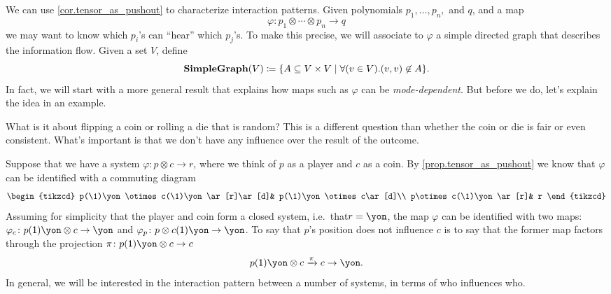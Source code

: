 \documentclass[Book-Poly]{subfiles}
\begin{document}
We can use \cref{cor.tensor_as_pushout} to characterize interaction patterns. Given polynomials $p_1,\ldots, p_n,$ and $q$, and a map
\[\varphi\colon p_1\otimes\cdots\otimes p_n\to q\]
we may want to know which $p_i$'s can ``hear'' which $p_j$'s. To make this precise, we will associate to $\varphi$ a simple directed graph that describes the information flow. Given a set $V$, define
\[
\textbf{SimpleGraph}(V)\coloneqq\{A\subseteq V\times V\mid \forall(v\in V). (v,v)\not\in A\}.
\]
In fact, we will start with a more general result that explains how maps such as $\varphi$ can be \emph{mode-dependent}. But before we do, let's explain the idea in an example.

\begin{example}\label{ex.random_process}
What is it about flipping a coin or rolling a die that is random? This is a different question than whether the coin or die is fair or even consistent. What's important is that we don't have any influence over the result of the outcome.

Suppose that we have a system $\varphi\colon p\otimes c\to r$, where we think of $p$ as a player and $c$ as a coin. By \cref{prop.tensor_as_pushout} we know that $\varphi$ can be identified with a commuting diagram
\[
\begin{tikzcd}
	p(\1)\yon\otimes c(\1)\yon\ar[r]\ar[d]&
	p(\1)\yon\otimes c\ar[d]\\
	p\otimes c(\1)\yon\ar[r]&
	r
\end{tikzcd}
\]
Assuming for simplicity that the player and coin form a closed system, i.e.\ that$r=\yon$, the map $\varphi$ can be identified with two maps: $\varphi_c\colon p(\1)\yon\otimes c\to\yon$ and $\varphi_p\colon p\otimes c(\1)\yon\to\yon$. To say that $p$'s position does not influence $c$ is to say that the former map factors through the projection $\pi\colon p(\1)\yon\otimes c\to c$
\[
	p(\1)\yon\otimes c\To{\pi} c\to \yon.
\]
In general, we will be interested in the interaction pattern between a number of systems, in terms of who influences who.
\end{example}
\end{document}
